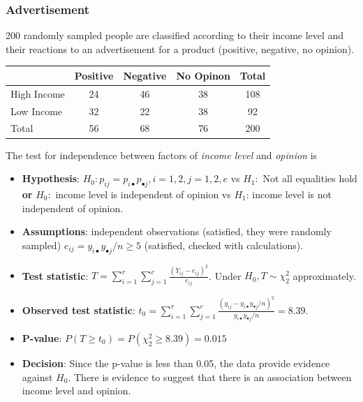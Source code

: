 \documentclass[a4paper]{article}
\begin{document}
\subsubsection{Advertisement}
200 randomly sampled people are classified according to their income level and their reactions to an advertisement for a product (positive, negative, no opinion).
\begin{table}[H]
	\centering
	\begin{tabular}{@{}lccc|c@{}}
	\toprule
				& Positive & Negative & No Opinon & Total \\ \midrule
	High Income & 24       & 46       & 38        & 108   \\
	Low Income  & 32       & 22       & 38        & 92    \\ \midrule
	Total		& 56       & 68       & 76        & 200   \\ \bottomrule
	\end{tabular}
\end{table}
The test for independence between factors of \textit{income level} and \textit{opinion} is
\begin{itemize}
	\item \textbf{Hypothesis}: \( H_0: p_{ij} = p_{i \bullet} p_{\bullet j}, i = 1,2, j = 1,2,e \) vs \( H_1: \) Not all equalities hold \textbf{or} \( H_0: \) income level is independent of opinion vs \( H_1 \):  income level is not independent of opinion. 
	\item \textbf{Assumptions}: independent observations (satisfied, they were randomly sampled) \( e_{ij} =y_{i \bullet} y_{\bullet j}/n \geq 5 \)  (satisfied, checked with calculations).
	\item \textbf{Test statistic}: \( T = \sum\limits_{i=1}^{r}\sum\limits_{j=1}^{c} \frac{(Y_{ij} - e_{ij})^2}{e_{ij}} \). Under \( H_0, T \sim \chi^2_2 \) approximately.
	\item \textbf{Observed test statistic}: \( t_0 = \sum_{i=1}^{r}\sum_{j=1}^{c}\frac{(y_{ij} - y_{i \bullet} y_{\bullet j}/n)^2}{y_{i \bullet}y_{\bullet j}/n} = 8.39 \).
	\item \textbf{P-value}: \( P(T\geq t_0) = P(\chi^2_2 \geq 8.39) = 0.015 \)
	\item \textbf{Decision}: Since the p-value is less than 0.05, the data provide evidence against \( H_0 \). There is evidence to suggest that there is an association between income level and opinion.
\end{itemize}
\end{document}
